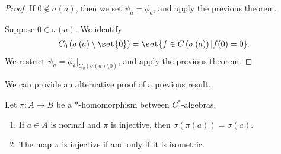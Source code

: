 \documentclass[10pt]{mypackage}
\begin{document}
\begin{proof}
  If $0\notin \sigma\left(a\right)$, then we set $\psi_a = \phi_a$, and apply the previous theorem.\newline

  Suppose $0\in\sigma\left(a\right)$. We identify
  \begin{align*}
    C_0\left(\sigma\left(a\right)\setminus \set{0}\right) = \set{f\in C\left(\sigma\left(a\right)\right) | f(0) = 0}.
  \end{align*}
  We restrict $\psi_a = \phi_a|_{C_0\left(\sigma\left(a\right)\setminus{0}\right)}$, and apply the previous theorem.
\end{proof}
We can provide an alternative proof of a previous result.
\begin{proposition}
  Let $\pi\colon A\rightarrow B$ be a $\ast$-homomorphism between $C^{\ast}$-algebras.
  \begin{enumerate}[(1)]
    \item If $a\in A$ is normal and $\pi$ is injective, then $\sigma\left(\pi\left(a\right)\right) = \sigma\left(a\right)$.
    \item The map $\pi$ is injective if and only if it is isometric.
  \end{enumerate}
\end{proposition}
\end{document}
